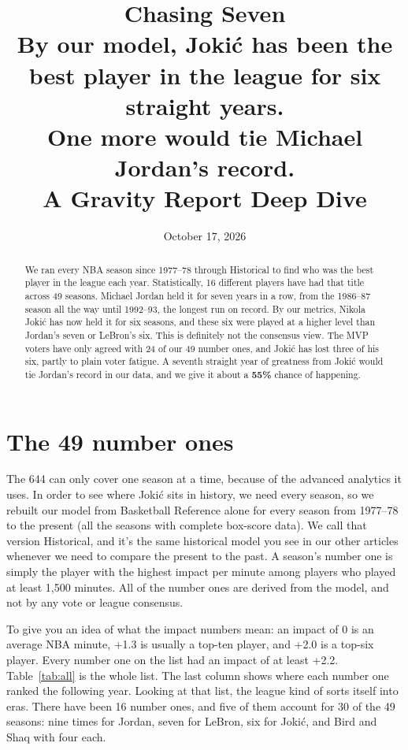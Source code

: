 \documentclass[11pt]{article}
\title{\textbf{Chasing Seven}\\[4pt]
\large By our model, Jokić has been the best player in the league for six straight years.\\
One more would tie Michael Jordan's record.\\[2pt]
\normalsize A Gravity Report Deep Dive}
\author{}
\date{October 17, 2026}
\begin{document}
\maketitle
\vspace{-2.5em}

\begin{abstract}
\noindent
We ran every NBA season since 1977--78 through \gravity{} Historical to find who was the best
player in the league each year. Statistically, 16 different players have had that title across
49 seasons. Michael Jordan held it for seven years in a row, from the 1986--87 season all the
way until 1992--93, the longest run on record. By our metrics, Nikola Jokić has now held it for
six seasons, and these six were played at a higher level than Jordan's seven or LeBron's six.
This is definitely not the consensus view. The MVP voters have only agreed with 24 of our 49
number ones, and Jokić has lost three of his six, partly to plain voter fatigue. A seventh
straight year of greatness from Jokić would tie Jordan's record in our data, and we give it
about a \textbf{55\%} chance of happening.
\end{abstract}

\section*{The 49 number ones}

The 644 can only cover one season at a time, because of the advanced analytics it uses. In
order to see where Jokić sits in history, we need every season, so we rebuilt our model from
Basketball Reference alone for every season from 1977--78 to the present (all the seasons with
complete box-score data). We call that
version \gravity{} Historical, and it's the same historical model you see in our other
articles whenever we need to compare the present to the past. A season's number one is simply
the player with the highest impact per minute among players who played at least 1,500 minutes.
All of the number ones are derived from the \gravity{} model, and not by any vote or league
consensus.

To give you an idea of what the impact numbers mean: an impact of 0 is an average NBA minute,
+1.3 is usually a top-ten player, and +2.0 is a top-six player. Every number one on the list
had an impact of at least +2.2. Table~\ref{tab:all} is the whole list. The last column shows
where each number one ranked the following year. Looking at that list, the league kind of
sorts itself into eras. There have been 16 number ones, and five of them account for 30 of the
49 seasons: nine times for Jordan, seven for LeBron, six for Jokić, and Bird and Shaq with
four each.
\end{document}
